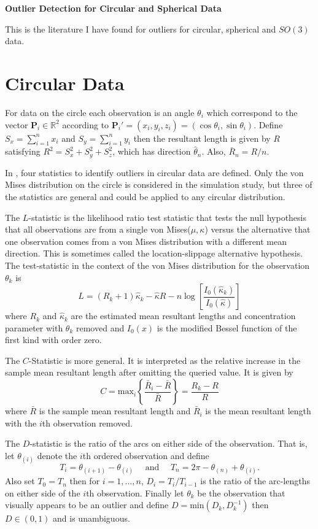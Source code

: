 \documentclass{article}\usepackage{graphicx, color}
\newcommand{\R}{{\mathbb{R}}}
\begin{document}
\begin{center}
\Large{\bf Outlier Detection for Circular and Spherical Data}
\end{center}
\normalsize
This is the literature I have found for outliers for circular, spherical and $SO(3)$ data.

\section{Circular Data}\label{sec:circle}

For data on the circle each observation is an angle $\theta_i$ which correspond to the vector $\bm P_i\in \R^2$ according to $\bm P_i'=(x_i,y_i,z_i)=(\cos\theta_i,\sin\theta_i)$.  Define $S_x=\sum_{i=1}^nx_i$ and $S_y=\sum_{i=1}^ny_i$ then the resultant length is given by $R$ satisfying $R^2=S_x^2+S_y^2+S_z^2$, which has direction $\hat\theta_n$.  Also, $\bar{R}_n=R/n$.

In \cite{collett1980}, four statistics to identify outliers in circular data are defined.  Only the von Mises distribution on the circle is considered in the simulation study, but three of the statistics are general and could be applied to any circular distribution. 

The $L$-statistic is the likelihood ratio test statistic that tests the null hypothesis that all observations are from a single von Mises($\mu,\kappa$) versus the alternative that one observation comes from a von Mises distribution with a different mean direction.  This is sometimes called the location-slippage alternative hypothesis.  The test-statistic in the context of the von Mises distribution for the observation $\theta_k$ is
\[
L=(R_k+1)\hat{\kappa}_k-\hat{\kappa}R-n\log\left[\frac{I_0(\hat{\kappa}_k)}{I_0(\hat{\kappa})}\right]
\]
where $R_k$ and $\hat\kappa_k$ are the estimated mean resultant lengths and concentration parameter with $\theta_k$ removed and $I_0(x)$ is the modified Bessel function of the first kind with order zero.

The $C$-Statistic is more general.  It is interpreted as the relative increase in the sample mean resultant length after omitting the queried value.  It is given by
\[
C=\text{max}_i\left\{\frac{\bar{R}_i-\bar{R}}{\bar{R}}\right\}=\frac{R_k-R}{R}
\]
where $\bar{R}$ is the sample mean resultant length and $\bar{R}_i$ is the mean resultant length with the $i$th observation removed.  

The $D$-statistic is the ratio of the arcs on either side of the observation.  That is, let $\theta_{(i)}$ denote the $i$th ordered observation and define
\[
T_i=\theta_{(i+1)}-\theta_{(i)}\hspace{1em}\text{ and }\hspace{1em}T_n=2\pi-\theta_{(n)}+\theta_{(i)}.
\]
 Also set $T_{0}=T_{n}$ then for $i=1,\dots,n$, $D_i=T_i/T_{i-1}$ is the ratio of the arc-lengths on either side of the $i$th observation.  Finally let $\theta_k$ be the observation that visually appears to be an outlier and define $D=\text{min}(D_k,D_{k}^{-1})$ then $D\in(0,1)$ and is unambiguous.
\end{document}
